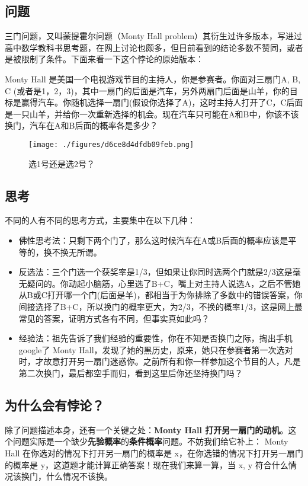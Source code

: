 
\begin{issues}
\issueDraft
\end{issues}

\subsection{问题}
三门问题，又叫蒙提霍尔问题（Monty Hall problem）其衍生过许多版本，写进过高中数学教科书思考题，在网上讨论也颇多，但目前看到的结论多数不赞同，或者是被限制了条件。下面来看一下这个悖论的原始版本：

Monty Hall 是美国一个电视游戏节目的主持人，你是参赛者。你面对三扇门A, B, C (或者是1，2，3)，其中一扇门的后面是汽车，另外两扇门后面是山羊，你的目标是赢得汽车。你随机选择一扇门(假设你选择了A)，这时主持人打开了C，C后面是一只山羊，并给你一次重新选择的机会。现在汽车只可能在A和B中，你该不该换门，汽车在A和B后面的概率各是多少？

\begin{figure}[ht]
\centering
\texttt{[image: ./figures/d6ce8d4dfdb09feb.png]}
\caption{选1号还是选2号？} \label{fig_MontyH_0}
\end{figure}

\subsection{思考}
不同的人有不同的思考方式，主要集中在以下几种：

\begin{itemize}
\item 佛性思考法：只剩下两个门了，那么这时候汽车在A或B后面的概率应该是平等的，换不换无所谓。

\item 反选法：三个门选一个获奖率是1/3，但如果让你同时选两个门就是2/3这是毫无疑问的。你动起小脑筋，心里选了B+C，嘴上对主持人说选A，之后不管她从B或C打开哪一个门(后面是羊)，都相当于为你排除了多数中的错误答案，你间接选择了B+C，所以换门的概率更大，为2/3，不换的概率1/3，这是网上最常见的答案，证明方式各有不同，但事实真如此吗？

\item 经验法：祖先告诉了我们经验的重要性，你在不知是否换门之际，掏出手机google了 Monty Hall，发现了她的黑历史，原来，她只在参赛者第一次选对时，才故意打开另一扇门迷惑你。之前所有和你一样参加这个节目的人，凡是第二次换门，最后都空手而归，看到这里后你还坚持换门吗？
\end{itemize}

\subsection{为什么会有悖论？}
除了问题描述本身，还有一个关键之处：\textbf{Monty Hall 打开另一扇门的动机}。这个问题实际是一个缺少\textbf{先验概率}的\textbf{条件概率}问题。不妨我们给它补上： Monty Hall 在你选对的情况下打开另一扇门的概率是 x，在你选错的情况下打开另一扇门的概率是 y，这道题才能计算正确答案！现在我们来算一算，当 x, y 符合什么情况该换门，什么情况不该换。

